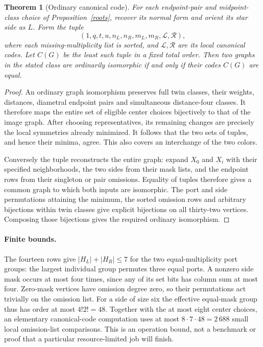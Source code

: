 \documentclass[11pt]{article}
\newtheorem{theorem}{Theorem}
\begin{document}
\begin{theorem}[Ordinary canonical code]
For each endpoint-pair and midpoint-class choice of
Proposition~\ref{roots}, recover its normal form and orient its star side
as $L$. Form the tuple
\[
 (1,q,t,u,n_L,n_R,m_L,m_R,\mathcal L,\mathcal R),
\]
where each missing-multiplicity list is sorted, and $\mathcal L,\mathcal R$
are its local canonical codes. Let $C(G)$ be the least such tuple in a
fixed total order. Then two graphs in the stated class are ordinarily
isomorphic if and only if their codes $C(G)$ are equal.
\end{theorem}
\begin{proof}
An ordinary graph isomorphism preserves full twin classes, their weights,
distances, diametral endpoint pairs and simultaneous distance-four
classes. It therefore maps the entire set of eligible center choices
bijectively to that of the image graph. After choosing representatives,
its remaining changes are precisely the local symmetries already
minimized. It follows that the two sets of tuples, and hence their
minima, agree. This also covers an interchange of the two colors.

Conversely the tuple reconstructs the entire graph: expand $X_0$ and
$X_i$ with their specified neighborhoods, the two sides from their mask
lists, and the endpoint rows from their singleton or pair omissions.
Equality of tuples therefore gives a common graph to which both inputs
are isomorphic. The port and side permutations attaining the minimum,
the sorted omission rows and arbitrary bijections within twin classes
give explicit bijections on all thirty-two vertices. Composing those
bijections gives the required ordinary isomorphism.
\end{proof}

\paragraph{Finite bounds.}
The fourteen rows give $|H_L|+|H_R|\leq7$ for the two equal-multiplicity
port groups: the largest individual group permutes three equal ports.
A nonzero side mask occurs at most four times, since any of its set bits
has column sum at most four. Zero-mask vertices have omission degree
zero, so their permutations act trivially on the omission list. For a
side of size six the effective equal-mask group thus has order at most
$4!2!=48$. Together with the at most eight center choices, an elementary
canonical-code computation uses at most $8\cdot7\cdot48=2\,688$ small
local omission-list comparisons. This is an operation bound, not a
benchmark or proof that a particular resource-limited job will finish.
\end{document}

